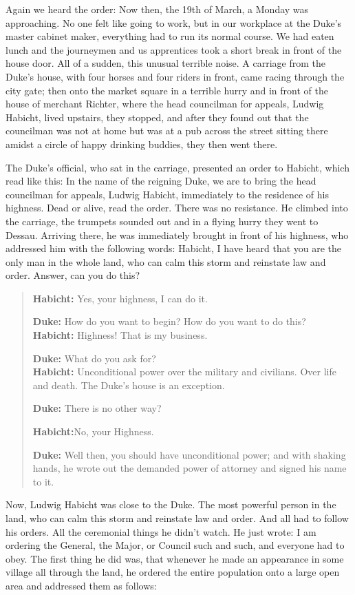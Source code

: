 \documentclass{article}
\begin{document}
Again we heard the order: Now then, the 19th of March, a Monday was approaching. No one felt like going to work, but in our workplace at the Duke's master cabinet maker, everything had to run its normal course. We had eaten lunch and the journeymen and us apprentices took a short break in front of the house door. All of a sudden, this unusual terrible noise. A carriage from the Duke's house, with four horses and four riders in front, came racing through the city gate; then onto the market square in a terrible hurry and in front of the house of merchant Richter, where the head councilman for appeals, Ludwig Habicht, lived upstairs, they stopped, and after they found out that the councilman was not at home but was at a pub across the street sitting there amidst a circle of happy drinking buddies, they then went there.

The Duke's official, who sat in the carriage, presented an order to Habicht, which read like this: In the name of the reigning Duke, we are to bring the head councilman for appeals, Ludwig Habicht, immediately to the residence of his highness. Dead or alive, read the order. There was no resistance. He climbed into the carriage, the trumpets sounded out and in a flying hurry they went to Dessau. Arriving there, he was immediately brought in front of his highness, who addressed him with the following words: Habicht, I have heard that you are the only man in the whole land, who can calm this storm and reinstate law and order. Answer, can you do this?

\begin{quote}
\textbf{Habicht:} Yes, your highness, I can do it.

\textbf{Duke:} How do you want to begin? How do you want to do this?\\
\textbf{Habicht:} Highness! That is my business.

\textbf{Duke:} What do you ask for?\\
\textbf{Habicht:} Unconditional power over the military and civilians. Over life and death. The Duke's house is an exception.

\textbf{Duke:} There is no other way?

\textbf{Habicht:}No, your Highness.

\textbf{Duke:} Well then, you should have unconditional power; and with shaking hands, he wrote out the demanded power of attorney and signed his name to it.
\end{quote}

Now, Ludwig Habicht was close to the Duke. The most powerful person in the land, who can calm this storm and reinstate law and order. And all had to follow his orders. All the ceremonial things he didn't watch. He just wrote: I am ordering the General, the Major, or Council such and such, and everyone had to obey. The first thing he did was, that whenever he made an appearance in some village all through the land, he ordered the entire population onto a large open area and addressed them as follows:
\end{document}
